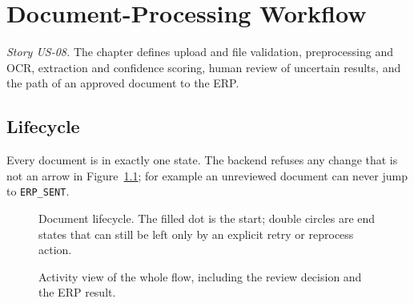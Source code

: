 \chapter{Document-Processing Workflow}\label{ch:p2flow}
\emph{Story US-08.} The chapter defines upload and file validation, preprocessing and OCR, extraction and confidence scoring, human review of uncertain results, and the path of an approved document to the ERP.

\section{Lifecycle}
Every document is in exactly one state. The backend refuses any change that is not an arrow in Figure~\ref{fig:p2state}; for example an unreviewed document can never jump to \texttt{ERP\_SENT}.
\begin{figure}[H]\centering
\resizebox{0.95\textwidth}{!}{}
\caption{Document lifecycle. The filled dot is the start; double circles are end states that can still be left only by an explicit retry or reprocess action.}\label{fig:p2state}
\end{figure}

\begin{figure}[H]\centering
\resizebox{0.95\textwidth}{!}{}
\caption{Activity view of the whole flow, including the review decision and the ERP result.}\label{fig:p2activity}
\end{figure}

